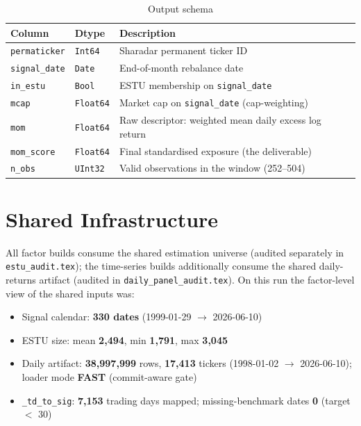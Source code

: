 \documentclass[11pt,a4paper]{article}
\begin{document}
\begin{table}[h!]
\centering
\caption{Output schema}
\begin{tabular}{llp{7.4cm}}
\toprule
\textbf{Column} & \textbf{Dtype} & \textbf{Description} \\
\midrule
\texttt{permaticker} & \texttt{Int64} & Sharadar permanent ticker ID \\
\texttt{signal\_date} & \texttt{Date} & End-of-month rebalance date \\
\texttt{in\_estu} & \texttt{Bool} & ESTU membership on \texttt{signal\_date} \\
\texttt{mcap} & \texttt{Float64} & Market cap on \texttt{signal\_date} (cap-weighting) \\
\texttt{mom} & \texttt{Float64} & Raw descriptor: weighted mean daily excess log return \\
\texttt{mom\_score} & \texttt{Float64} & Final standardised exposure (the deliverable) \\
\texttt{n\_obs} & \texttt{UInt32} & Valid observations in the window (252--504) \\
\bottomrule
\end{tabular}
\end{table}

\section{Shared Infrastructure}

All factor builds consume the shared estimation universe
 (audited separately in
\texttt{estu\_audit.tex}); the time-series builds additionally consume the
shared daily-returns artifact (audited in \texttt{daily\_panel\_audit.tex}).
On this run the factor-level view of the shared inputs was:

\begin{itemize}[leftmargin=*,topsep=2pt,itemsep=2pt]
  \item Signal calendar: \textbf{330 dates} (1999-01-29 $\to$ 2026-06-10)
  \item ESTU size: mean \textbf{2{,}494}, min \textbf{1{,}791}, max \textbf{3{,}045}
  \item Daily artifact: \textbf{38{,}997{,}999} rows, \textbf{17{,}413} tickers (1998-01-02 $\to$ 2026-06-10); loader mode \textbf{FAST} (commit-aware gate)
  \item \texttt{\_td\_to\_sig}: \textbf{7{,}153} trading days mapped; missing-benchmark dates \textbf{0} (target $<$ 30)
\end{itemize}
\end{document}
